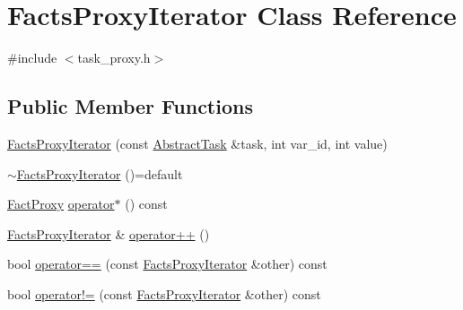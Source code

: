 \hypertarget{classFactsProxyIterator}{\section{Facts\-Proxy\-Iterator Class Reference}
\label{classFactsProxyIterator}
}


{\ttfamily \#include $<$task\-\_\-proxy.\-h$>$}

\subsection*{Public Member Functions}
\begin{DoxyCompactItemize}
\item 
\hyperlink{classFactsProxyIterator_a3fe87e378b4dddbb51979e1544120de6}{Facts\-Proxy\-Iterator} (const \hyperlink{classAbstractTask}{Abstract\-Task} \&task, int var\-\_\-id, int value)
\item 
\hyperlink{classFactsProxyIterator_a41edfad24ae659e35291099fb3acbf15}{$\sim$\-Facts\-Proxy\-Iterator} ()=default
\item 
\hyperlink{classFactProxy}{Fact\-Proxy} \hyperlink{classFactsProxyIterator_af0891d334843f52ff0fa2a57587d044f}{operator$\ast$} () const 
\item 
\hyperlink{classFactsProxyIterator}{Facts\-Proxy\-Iterator} \& \hyperlink{classFactsProxyIterator_a55685a9585cf105d9989daaf26f181f8}{operator++} ()
\item 
bool \hyperlink{classFactsProxyIterator_a3235d2ef67299f4507e1e5a6a8a3eeac}{operator==} (const \hyperlink{classFactsProxyIterator}{Facts\-Proxy\-Iterator} \&other) const 
\item 
bool \hyperlink{classFactsProxyIterator_af6f11116d33e9e9d0783b00afa8f98b2}{operator!=} (const \hyperlink{classFactsProxyIterator}{Facts\-Proxy\-Iterator} \&other) const 
\end{DoxyCompactItemize}


